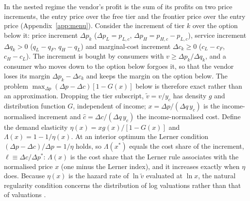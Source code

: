 \documentclass[11pt]{article}
\theoremstyle{definition}
\theoremstyle{remark}
\begin{document}
In the nested regime the vendor's profit is the sum of its profits on two price increments, the entry price over the free tier and the frontier price over the entry price (Appendix~\ref{app:menu}). Consider the increment of tier $k$ over the option below it: price increment $\Delta p_k$ ($\Delta p_L=p_{L,c}$, $\Delta p_H=p_{H,c}-p_{L,c}$), service increment $\Delta q_k>0$ ($q_L-q_F$, $q_H-q_L$) and marginal-cost increment $\Delta c_k\ge0$ ($c_L-c_F$, $c_H-c_L$). The increment is bought by consumers with $v\ge\Delta p_k/\Delta q_k$, and a consumer who moves down to the option below forgoes it, so that the vendor loses its margin $\Delta p_k-\Delta c_k$ and keeps the margin on the option below. The problem $\max_{\Delta p}(\Delta p-\Delta c)[1-G(x)]$ below is therefore exact rather than an approximation. Dropping the tier subscript, $\tilde v=v/y_c$ has density $g$ and distribution function $G$, independent of income; $x=\Delta p/(\Delta q\,y_c)$ is the income-normalised increment and $\hat c=\Delta c/(\Delta q\,y_c)$ the income-normalised cost. Define the demand elasticity $\eta(x)=xg(x)/[1-G(x)]$ and $\Lambda(x)=1-1/\eta(x)$. At an interior optimum the Lerner condition $(\Delta p-\Delta c)/\Delta p=1/\eta$ holds, so $\Lambda(x^*)$ equals the cost share of the increment, $\ell\equiv\Delta c/\Delta p^*$: $\Lambda(x)$ is the cost share that the Lerner rule associates with the normalised price $x$ (one minus the Lerner index), and it increases exactly when $\eta$ does. Because $\eta(x)$ is the hazard rate of $\ln\tilde v$ evaluated at $\ln x$, the natural regularity condition concerns the distribution of log valuations rather than that of valuations \citep{bagnoli2005logconcave}.
\end{document}

